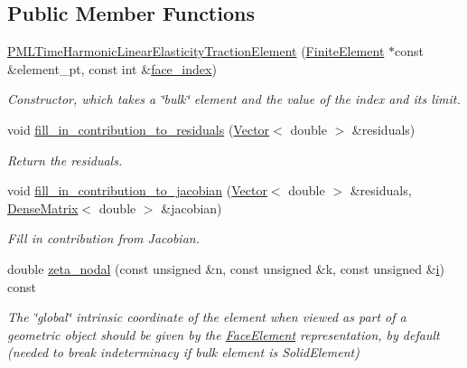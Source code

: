 \subsection*{Public Member Functions}
\begin{DoxyCompactItemize}
\item 
\hyperlink{classoomph_1_1PMLTimeHarmonicLinearElasticityTractionElement_a39560a5b7d4a7b5761cd1f85ee3333eb}{P\+M\+L\+Time\+Harmonic\+Linear\+Elasticity\+Traction\+Element} (\hyperlink{classoomph_1_1FiniteElement}{Finite\+Element} $\ast$const \&element\+\_\+pt, const int \&\hyperlink{classoomph_1_1FaceElement_a478d577ac6db67ecc80f1f02ae3ab170}{face\+\_\+index})
\begin{DoxyCompactList}\small\item\em Constructor, which takes a \char`\"{}bulk\char`\"{} element and the value of the index and its limit. \end{DoxyCompactList}\item 
void \hyperlink{classoomph_1_1PMLTimeHarmonicLinearElasticityTractionElement_ae1452136ed8ce12c00470c97266521e9}{fill\+\_\+in\+\_\+contribution\+\_\+to\+\_\+residuals} (\hyperlink{classoomph_1_1Vector}{Vector}$<$ double $>$ \&residuals)
\begin{DoxyCompactList}\small\item\em Return the residuals. \end{DoxyCompactList}\item 
void \hyperlink{classoomph_1_1PMLTimeHarmonicLinearElasticityTractionElement_abde183ce1fbe5c0d8ce199978a972394}{fill\+\_\+in\+\_\+contribution\+\_\+to\+\_\+jacobian} (\hyperlink{classoomph_1_1Vector}{Vector}$<$ double $>$ \&residuals, \hyperlink{classoomph_1_1DenseMatrix}{Dense\+Matrix}$<$ double $>$ \&jacobian)
\begin{DoxyCompactList}\small\item\em Fill in contribution from Jacobian. \end{DoxyCompactList}\item 
double \hyperlink{classoomph_1_1PMLTimeHarmonicLinearElasticityTractionElement_a035a8fcd22c01966f16e83e7c3517569}{zeta\+\_\+nodal} (const unsigned \&n, const unsigned \&k, const unsigned \&\hyperlink{cfortran_8h_adb50e893b86b3e55e751a42eab3cba82}{i}) const
\begin{DoxyCompactList}\small\item\em The \char`\"{}global\char`\"{} intrinsic coordinate of the element when viewed as part of a geometric object should be given by the \hyperlink{classoomph_1_1FaceElement}{Face\+Element} representation, by default (needed to break indeterminacy if bulk element is Solid\+Element) \end{DoxyCompactList}\item 

\end{DoxyCompactItemize}
